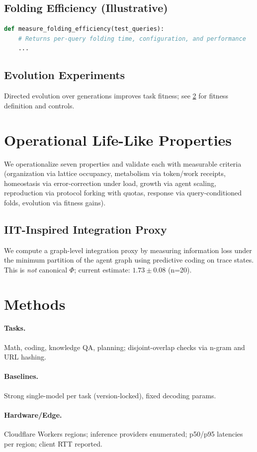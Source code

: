 \documentclass[11pt]{article}
\begin{document}
\subsection{Folding Efficiency (Illustrative)}
\begin{lstlisting}[style=code,language=Python]
def measure_folding_efficiency(test_queries):
    # Returns per-query folding time, configuration, and performance
    ...
\end{lstlisting}
\subsection{Evolution Experiments}
Directed evolution over generations improves task fitness; see \cref{sec:methods} for fitness definition and controls.
\section{Operational Life-Like Properties}
We operationalize seven properties and validate each with measurable criteria (organization via lattice occupancy, metabolism via token/work receipts, homeostasis via error-correction under load, growth via agent scaling, reproduction via protocol forking with quotas, response via query-conditioned folds, evolution via fitness gains).
\subsection*{IIT-Inspired Integration Proxy}
We compute a graph-level integration proxy by measuring information loss under the minimum partition of the agent graph using predictive coding on trace states. This is \emph{not} canonical $\Phi$; current estimate: $1.73 \pm 0.08$ (n=20).
\section{Methods}
\label{sec:methods}
\paragraph{Tasks.} Math, coding, knowledge QA, planning; disjoint-overlap checks via n-gram and URL hashing.\\
\paragraph{Baselines.} Strong single-model per task (version-locked), fixed decoding params.\\
\paragraph{Hardware/Edge.} Cloudflare Workers regions; inference providers enumerated; p50/p95 latencies per region; client RTT reported.\\
\end{document}
